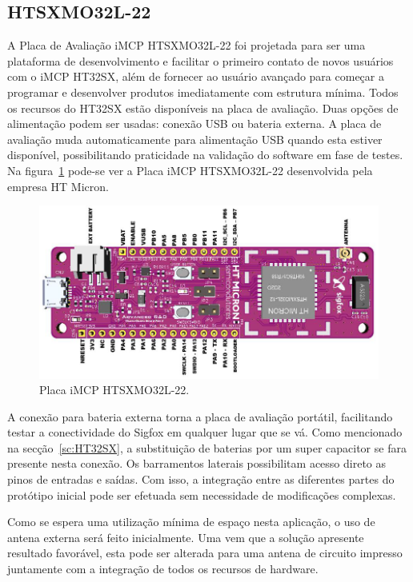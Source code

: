 \subsection{HTSXMO32L-22}
A Placa de Avaliação iMCP HTSXMO32L-22 foi projetada para ser uma plataforma de desenvolvimento e facilitar o primeiro contato de novos usuários com o iMCP HT32SX, além de fornecer ao usuário avançado para começar a programar e desenvolver produtos imediatamente com estrutura mínima. Todos os recursos do HT32SX estão disponíveis na placa de avaliação. Duas opções de alimentação podem ser usadas: conexão USB ou bateria externa. A placa de avaliação muda automaticamente para alimentação USB quando esta estiver disponível, possibilitando praticidade na validação do software em fase de testes.  Na figura~\ref{fig:placaHT32SX} pode-se ver a Placa iMCP HTSXMO32L-22 desenvolvida pela empresa HT Micron.

\begin{figure}
  \caption{Placa iMCP HTSXMO32L-22.}
  \begin{center}
      \includegraphics[scale=0.5]{img/placa.png}
  \end{center}
  \label{fig:placaHT32SX}
\end{figure}

A conexão para bateria externa torna a placa de avaliação portátil, facilitando testar a conectividade do Sigfox em qualquer lugar que se vá. Como mencionado na secção~\ref{sc:HT32SX}, a substituição de baterias por um super capacitor se fara presente nesta conexão. Os barramentos laterais possibilitam acesso direto as pinos de entradas e saídas. Com isso, a integração entre as diferentes partes do protótipo inicial pode ser efetuada sem necessidade de modificações complexas.

Como se espera uma utilização mínima de espaço nesta aplicação, o uso de antena externa será feito inicialmente. Uma vem que a solução apresente resultado favorável, esta pode ser alterada para uma antena de circuito impresso juntamente com a integração de todos os recursos de hardware. 
